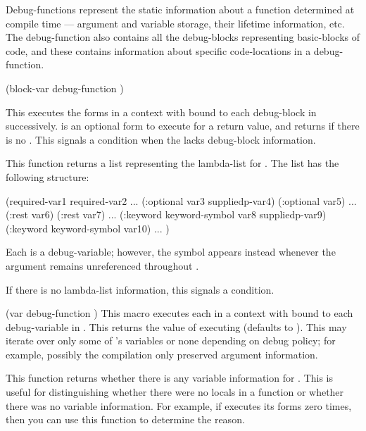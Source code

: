 {Debug-functions represent the static information about a function determined at
compile time --- argument and variable storage, their lifetime information,
etc.  The debug-function also contains all the debug-blocks representing
basic-blocks of code, and these contains information about specific
code-locations in a debug-function.

  {(block-var debug-function ) }

This executes the forms in a context with  bound to each
debug-block in  successively.   is
an optional form to execute for a return value, and
 returns \nil if there is no
.  This signals a  condition when the
 lacks debug-block information.
\enddefmac


This function returns a list representing the lambda-list for 
.  The list has the following structure:
\begin{example}
   (required-var1 required-var2
    ...
    (:optional var3 suppliedp-var4)
    (:optional var5)
    ...
    (:rest var6) (:rest var7)
    ...
    (:keyword keyword-symbol var8 suppliedp-var9)
    (:keyword keyword-symbol var10)
    ...
    )
\end{example}
Each  is a debug-variable; however, the symbol
 appears instead whenever the argument remains unreferenced
throughout .

If there is no lambda-list information, this signals a
 condition.
\enddefun


  {(var debug-function ) }
This macro executes each  in a context with  bound to each
debug-variable in .  This returns the value of executing
 (defaults to \nil).  This may iterate over only some of 
's variables or none depending on debug policy; for example,
possibly the compilation only preserved argument information.
\enddefmac


This function returns whether there is any variable information for 
.  This is useful for distinguishing whether there were no
locals in a function or whether there was no variable information.  For
example, if  executes its forms zero times,
then you can use this function to determine the reason.
\enddefun


}
